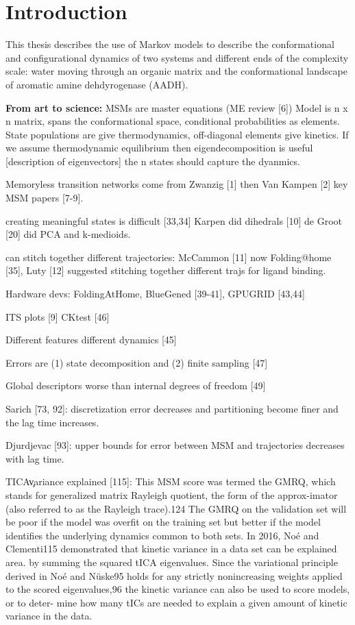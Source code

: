 %
%
\let\textcircled=\pgftextcircled
\chapter{Introduction}
\label{chap:intro}

This thesis describes the use of Markov models to describe the conformational and configurational dynamics of two systems and different ends of the complexity scale: water moving through an organic matrix and the conformational landscape of aromatic amine dehdyrogenase (AADH). 

\textbf{From art to science:} 
MSMs are master equations (ME review [6])
Model is n x n matrix, spans the conformational space, conditional probabilities as elements. 
State populations are give thermodynamics, off-diagonal elements give kinetics. 
If we assume thermodynamic equilibrium then eigendecomposition is useful [description of eigenvectors]
the n states should capture the dyanmics. 

Memoryless transition networks come from Zwanzig [1] then Van Kampen [2] key MSM papers [7-9]. 

creating meaningful states is difficult [33,34] Karpen did dihedrals [10] de Groot [20] did PCA and k-medioids.

can stitch together different trajectories: McCammon [11] now Folding@home [35], Luty [12] suggested stitching together different trajs for ligand binding. 

Hardware devs: FoldingAtHome, BlueGened [39-41], GPUGRID [43,44]

ITS plots [9] CKtest [46]

Different features different dynamics [45]

Errors are (1) state decomposition and (2) finite sampling [47]

Global descriptors worse than internal degrees of freedom [49]

Sarich [73, 92]: discretization error decreases and partitioning become finer and the lag time increases. 

Djurdjevac [93]: upper bounds for error between MSM and trajectories decreases with lag time. 

TICA\c variance explained [115]:
This MSM score was termed the GMRQ, which stands for
generalized matrix Rayleigh quotient, the form of the approx-imator (also referred to as the Rayleigh trace).124
The GMRQ on the validation set will be poor if the model was overfit on the
training set but better if the model identifies the underlying
dynamics common to both sets. In 2016, Noé and Clementi115 demonstrated that kinetic variance in a data set can be explained area.
by summing the squared tICA eigenvalues. Since the variational principle derived in Noé and Nüske95 holds for any strictly nonincreasing weights applied to the scored eigenvalues,96 the kinetic variance can also be used to score models, or to deter- mine how many tICs are needed to explain a given amount of kinetic variance in the data.

